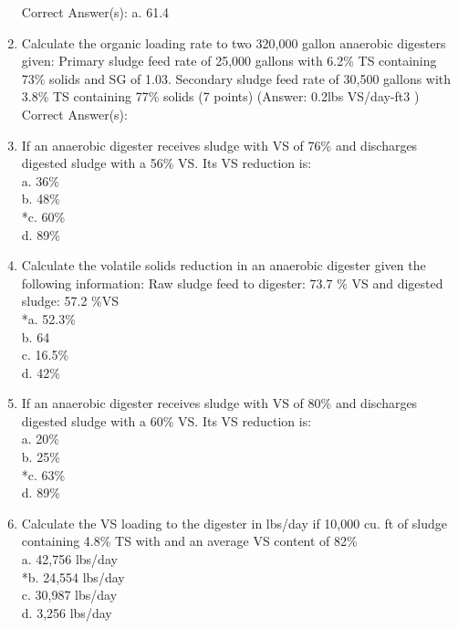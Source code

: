 \documentclass{article}
\begin{document}
\begin{enumerate}
Correct Answer(s):
a. 61.4 \\

\item  Calculate the organic loading rate to two 320,000 gallon anaerobic digesters given:
Primary sludge feed rate of 25,000 gallons with 6.2\% TS containing 73\% solids and SG of 1.03.
Secondary sludge feed rate of 30,500 gallons with 3.8\% TS containing 77\% solids (7 points)
(Answer: 0.2lbs VS/day-ft3 ) \\

Correct Answer(s): \\

\item  If an anaerobic digester receives sludge with VS of 76\% and discharges digested sludge with a 56\% VS.  Its VS reduction is: \\

a. 36\% \\
b. 48\% \\
*c. 60\% \\
d. 89\% \\

\item  Calculate the volatile solids reduction in an anaerobic digester given the following information:  Raw sludge feed to digester:  73.7 \% VS and digested sludge: 57.2 \%VS \\

*a. 52.3\% \\
b. 64 \\
c. 16.5\% \\
d. 42\% \\

\item  If an anaerobic digester receives sludge with VS of 80\% and discharges digested sludge with a 60\% VS.  Its VS reduction is: \\

a. 20\% \\
b. 25\% \\
*c. 63\% \\
d. 89\% \\

\item  Calculate the VS loading to the digester in lbs/day if 10,000 cu. ft of sludge containing 4.8\% TS with and an average VS content of 82\% \\

a. 42,756 lbs/day \\
*b. 24,554 lbs/day \\
c. 30,987 lbs/day \\
d. 3,256 lbs/day \\


\end{enumerate}
\end{document}
